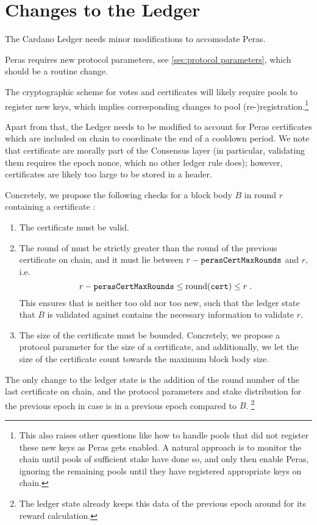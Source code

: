 \section{Changes to the Ledger}\label{sec:ledger changes}

The Cardano Ledger \parencite{shelley-ledger-specs,cardano-formal-ledger-specs} needs minor modifications to accomodate Peras.

Peras requires new protocol parameters, see \cref{sec:protocol parameters}, which should be a routine change.

The cryptographic scheme for votes and certificates \parencite{peras-cert-report} will likely require pools to register new keys, which implies corresponding changes to pool (re-)registration.\footnote{
  This also raises other questions like how to handle pools that did not register these new keys as Peras gets enabled.
  A natural approach is to monitor the chain until pools of sufficient stake have done so, and only then enable Peras, ignoring the remaining pools until they have registered appropriate keys on chain.}

Apart from that, the Ledger needs to be modified to account for Peras certificates which are included on chain to coordinate the end of a cooldown period.
We note that certificate are morally part of the Consensus layer (in particular, validating them requires the epoch nonce, which no other ledger rule does); however, certificates are likely too large to be stored in a header.

Concretely, we propose the following checks for a block body $B$ in round $r$ containing a certificate \cert{}:
\begin{enumerate}
\item
  The certificate \cert{} must be valid.
\item
  The round of \cert{} must be strictly greater than the round of the previous certificate on chain, and it must lie between $r-\mathtt{perasCertMaxRounds}$ and $r$, i.e.\
  \[ r-\mathtt{perasCertMaxRounds} \le \operatorname{round}(\mathtt{cert}) \le r \;. \]
  This ensures that \cert{} is neither too old nor too new, such that the ledger state that $B$ is validated against contains the necessary information to validate $r$.
\item
  The size of the certificate must be bounded.
  Concretely, we propose a protocol parameter \perasCertSizeLimit{} for the size of a certificate, and additionally, we let the size of the certificate count towards the maximum block body size.
\end{enumerate}
The only change to the ledger state is the addition of the round number of the last certificate on chain, and the protocol parameters and stake distribution for the previous epoch in case \cert{} is in a previous epoch compared to $B$.%
\footnote{The ledger state already keeps this data of the previous epoch around for its reward calculation.}

